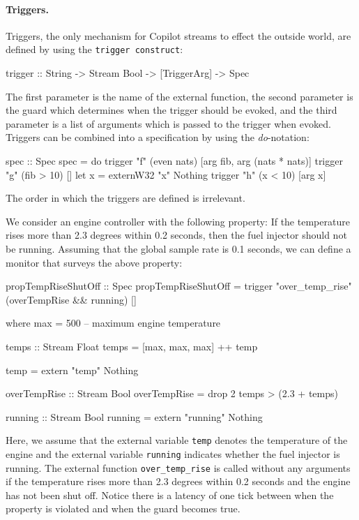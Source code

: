 \paragraph{Triggers.}
Triggers, the only mechanism for Copilot streams to effect the outside world,
are defined by using the {\tt trigger construct}:
%
\begin{code}
trigger :: String -> Stream Bool -> [TriggerArg] -> Spec
\end{code}
%
The first parameter is the name of the external function, the second parameter is the
guard which determines when the trigger should be evoked, and the third parameter
is a list of arguments which is passed to the trigger when evoked.
Triggers can be combined into a specification by using the \emph{do}-notation:
%
\begin{code}
spec :: Spec
spec = do
  trigger "f" (even nats) [arg fib, arg (nats * nats)]
  trigger "g" (fib > 10) []
  let x = externW32 "x" Nothing
  trigger "h" (x < 10) [arg x]
\end{code}
%
The order in which the triggers are defined is irrelevant.

\begin{example}
\label{exm:engine}
We consider an engine controller with the following property: If the temperature
rises more than 2.3 degrees within 0.2 seconds, then the fuel injector should
not be running.  Assuming that the global sample rate is 0.1 seconds, we can
define a monitor that surveys the above property:
%
\begin{code}
propTempRiseShutOff :: Spec
propTempRiseShutOff = 
  trigger "over_temp_rise" 
    (overTempRise && running) []

  where
  max = 500 -- maximum engine temperature

  temps :: Stream Float
  temps = [max, max, max] ++ temp

  temp = extern "temp" Nothing

  overTempRise :: Stream Bool
  overTempRise = drop 2 temps > (2.3 + temps) 
 
  running :: Stream Bool
  running = extern "running" Nothing
\end{code}
%

Here, we assume that the external variable {\tt temp} denotes the temperature of
the engine and the external variable {\tt running} indicates whether the fuel
injector is running.  The external function {\tt over\_temp\_rise} is called
without any arguments if the temperature rises more than 2.3 degrees within 0.2
seconds and the engine has not been shut off.  Notice there is a latency of one
tick between when the property is violated and when the guard becomes true.
\end{example}

